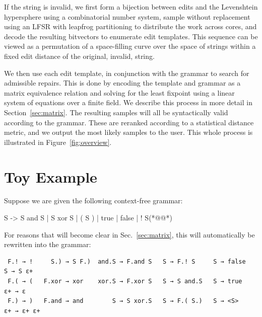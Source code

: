 \documentclass[sigplan,review,anonymous,acmsmall]{acmart}\settopmatter{printfolios=false,printccs=false,printacmref=false}
\begin{document}
If the string is invalid, we first form a bijection between edits and the Levenshtein hypersphere using a combinatorial number system, sample without replacement using an LFSR with leapfrog partitioning to distribute the work across cores, and decode the resulting bitvectors to enumerate edit templates. This sequence can be viewed as a permutation of a space-filling curve over the space of strings within a fixed edit distance of the original, invalid, string.

We then use each edit template, in conjunction with the grammar to search for admissible repairs. This is done by encoding the template and grammar as a matrix equivalence relation and solving for the least fixpoint using a linear system of equations over a finite field. We describe this process in more detail in Section~\ref{sec:matrix}. The resulting samples will all be syntactically valid according to the grammar. These are reranked according to a statistical distance metric, and we output the most likely samples to the user. This whole process is illustrated in Figure~\ref{fig:overview}.


\section{Toy Example}

Suppose we are given the following context-free grammar:

\begin{wholetidyinput}
S -> S and S | S xor S | ( S ) | true | false | ! S(*@\caret{ }@*)
\end{wholetidyinput}

\noindent For reasons that will become clear in Sec.~\ref{sec:matrix}, this will automatically be rewritten into the grammar:

\begin{verbatim}
 F.! → !     S.) → S F.)  and.S → F.and S   S → F.! S     S → false    S → S ε+
 F.( → (   F.xor → xor    xor.S → F.xor S   S → S and.S   S → true    ε+ → ε
 F.) → )   F.and → and        S → S xor.S   S → F.( S.)   S → <S>     ε+ → ε+ ε+
\end{verbatim}
\end{document}
